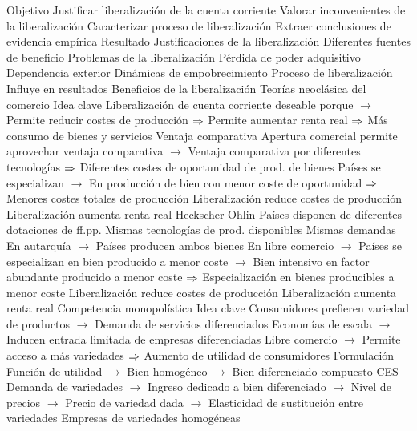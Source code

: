 \documentclass{nuevotema}
\begin{document}
\begin{esquemal}
			\3 Objetivo
				\4 Justificar liberalización de la cuenta corriente
				\4 Valorar inconvenientes de la liberalización
				\4 Caracterizar proceso de liberalización
				\4 Extraer conclusiones de evidencia empírica
			\3 Resultado
				\4 Justificaciones de la liberalización
				\4[] Diferentes fuentes de beneficio
				\4 Problemas de la liberalización
				\4[] Pérdida de poder adquisitivo
				\4[] Dependencia exterior
				\4[] Dinámicas de empobrecimiento
				\4 Proceso de liberalización
				\4[] Influye en resultados
		\2 Beneficios de la liberalización
			\3 Teorías neoclásica del comercio
				\4 Idea clave
				\4[] Liberalización de cuenta corriente deseable porque
				\4[] $\to$ Permite reducir costes de producción
				\4[] $\then$ Permite aumentar renta real
				\4[] $\then$ Más consumo de bienes y servicios
				\4 Ventaja comparativa
				\4[] Apertura comercial permite aprovechar ventaja comparativa
				\4[] $\to$ Ventaja comparativa por diferentes tecnologías
				\4[] $\then$ Diferentes costes de oportunidad de prod. de bienes
				\4[] Países se especializan
				\4[] $\to$ En producción de bien con menor coste de oportunidad
				\4[] $\then$ Menores costes totales de producción
				\4[$\then$] Liberalización reduce costes de producción
				\4[$\then$] Liberalización aumenta renta real
				\4 Heckscher-Ohlin
				\4[] Países disponen de diferentes dotaciones de ff.pp.
				\4[] Mismas tecnologías de prod. disponibles
				\4[] Mismas demandas
				\4[] En autarquía
				\4[] $\to$ Países producen ambos bienes
				\4[] En libre comercio
				\4[] $\to$ Países se especializan en bien producido a menor coste
				\4[] $\to$ Bien intensivo en factor abundante producido a menor coste
				\4[] $\then$ Especialización en bienes producibles a menor coste
				\4[$\then$] Liberalización reduce costes de producción
				\4[$\then$] Liberalización aumenta renta real
			\3 Competencia monopolística
				\4 Idea clave
				\4[] Consumidores prefieren variedad de productos
				\4[] $\to$ Demanda de servicios diferenciados
				\4[] Economías de escala
				\4[] $\to$ Inducen entrada limitada de empresas diferenciadas
				\4[] Libre comercio
				\4[] $\to$ Permite acceso a más variedades
				\4[] $\then$ Aumento de utilidad de consumidores
				\4 Formulación
				\4[] Función de utilidad
				\4[] $\to$ Bien homogéneo
				\4[] $\to$ Bien diferenciado compuesto CES
				\4[] Demanda de variedades
				\4[] $\to$ Ingreso dedicado a bien diferenciado
				\4[] $\to$ Nivel de precios
				\4[] $\to$ Precio de variedad dada
				\4[] $\to$ Elasticidad de sustitución entre variedades
				\4[] Empresas de variedades homogéneas

\end{esquemal}
\end{document}
